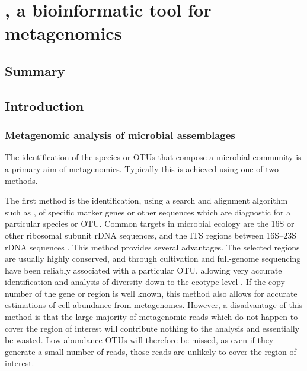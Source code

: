 \chapter{, a bioinformatic tool for metagenomics}
\label{ch:minspec}


\section{Summary}

\section{Introduction}

\subsection{Metagenomic analysis of microbial assemblages}

The identification of the species or \acp{OTU} that compose a microbial community is a primary aim of metagenomics.
Typically this is achieved using one of two methods.

The first method is the identification, using a search and alignment algorithm such as , of specific marker genes or other sequences which are diagnostic for a particular species or \ac{OTU}.
Common targets in microbial ecology are the 16S or other ribosomal subunit rDNA sequences, and the \ac{ITS} regions between 16S--23S rDNA sequences \citep[e.g.][]{Brown:2012gna}.
This method provides several advantages.
The selected regions are usually highly conserved, and through cultivation and full-genome sequencing have been reliably associated with a particular \ac{OTU}, allowing very accurate identification and analysis of diversity down to the ecotype level \citep[e.g.][]{Brown:2012gna}.
If the copy number of the gene or region is well known, this method also allows for accurate estimations of cell abundance from metagenomes.
However, a disadvantage of this method is that the large majority of metagenomic reads which do not happen to cover the region of interest will contribute nothing to the analysis and essentially be wasted.
Low-abundance \acp{OTU} will therefore be missed, as even if they generate a small number of reads, those reads are unlikely to cover the region of interest.

